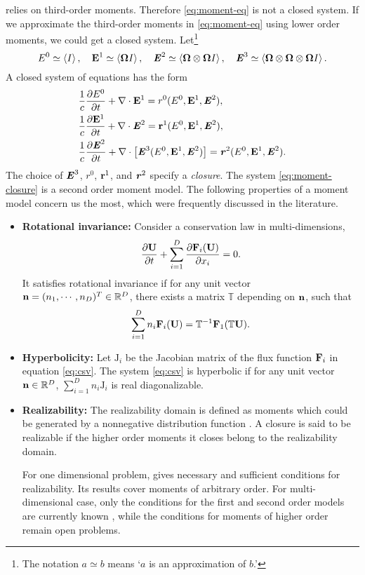 relies on third-order moments. Therefore \eqref{eq:moment-eq}
is not a closed system. If we approximate the third-order moments in \eqref{eq:moment-eq}
using lower order moments, we could get a closed system. 
Let\footnote{
The notation $a \simeq b$ means `$a$ is an 
approximation of $b$.'
}
\[
  E^0 \simeq \left\langle I \right\rangle, \quad
  \mathbf{E}^1 \simeq \left\langle \boldsymbol{\Omega} I \right\rangle, \quad
  \boldsymbol{\mathit{E}}^2 \simeq \left\langle \boldsymbol{\Omega}\otimes\boldsymbol{\Omega} I \right\rangle, \quad
  \boldsymbol{\mathit{E}}^3 \simeq \left\langle \boldsymbol{\Omega}\otimes\boldsymbol{\Omega}\otimes\boldsymbol{\Omega}
  I \right\rangle.
\]
A closed system of equations has the form
\begin{equation}\label{eq:moment-closure}
  \begin{split}
    & \dfrac1c\pd{E^0}{t} + \nabla\cdot\bE^1 = r^0(E^0, \bE^1, \bbrE^2), \\
    & \dfrac1c \pd{\bE^1}{t} + \nabla \cdot \bbrE^2 = 
    \br^1(E^0, \bE^1, \bbrE^2), \\
    & \dfrac1c \pd{\bbrE^2}{t} + \nabla \cdot \left[\bbrE^3(E^0, \bE^1,
  \bbrE^2)\right] = 
    \bbr^2(E^0, \bE^1, \bbrE^2).
  \end{split}
\end{equation}
The choice of $\boldsymbol{\mathit{E}}^3$, $r^0$, $\mathbf{r}^1$, and $\boldsymbol{\mathit{r}}^2$ specify a
\emph{closure}.  The system \eqref{eq:moment-closure} is a second
order moment model.  The following properties of a moment model
concern us the most, which were frequently discussed in the
literature.
\begin{itemize}
\item[] {\bf Rotational invariance: }
Consider a conservation law in multi-dimensions,
\begin{equation}\label{eq:csv}
  \pd{\bU}{t} + \sum\limits_{i=1}^D 
  \pd{\bF_i(\bU)}{x_i} = 0.
\end{equation}
It satisfies rotational invariance if for any unit
vector $\mathbf{n}=(n_1, \cdots, n_D)^T \in\mathbb{R}^D$, there exists a matrix
$\mathbb{T}$ depending on $\mathbf{n}$, such that
\[
  \sum\limits_{i=1}^D n_i \mathbf{F}_i(\mathbf{U}) = 
  \mathbb{T}^{-1} \mathbf{F}_1(\mathbb{T} \mathbf{U}).
\]

\item[] {\bf Hyperbolicity:}
Let $\boldsymbol{\mathrm{J}}_i$ be the Jacobian matrix
of the flux function $\mathbf{F}_i$ in equation \eqref{eq:csv}.
The system \eqref{eq:csv} is hyperbolic if for any
unit vector $\mathbf{n}\in\mathbb{R}^D$, 
$\sum\limits_{i=1}^D n_i \boldsymbol{\mathrm{J}}_i$
is real diagonalizable.

\item[] {\bf Realizability:}
The realizability domain is defined as moments which 
could be generated by a nonnegative distribution
function \cite{junk2000maximum}. A closure is said
to be realizable if the higher order moments it
closes belong to the realizability domain.

For one dimensional problem, \cite{CurFial91} gives necessary and
sufficient conditions for realizability. Its results cover moments of
arbitrary order.  For multi-dimensional case, only the conditions for
the first and second order models are currently known
\cite{kershaw1976flux}, while the conditions for moments of higher
order remain open problems.
\end{itemize}

